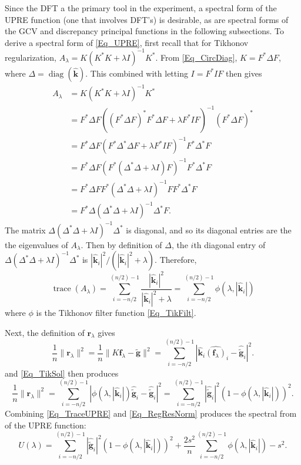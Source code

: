 \documentclass[12pt]{article}
\newcommand{\gnoise}{\widetilde{\mathbf{g}}}
\newcommand{\kdis}{\mathbf{k}}
\newcommand{\kmat}{K}	%
\newcommand{\fdis}{\mathbf{f}}
\newcommand{\ctrans}{*}	%
\newcommand{\trace}{\operatorname{trace}}	%
\newcommand{\diag}{\operatorname{diag}}
\newcommand{\regparam}{\lambda}
\newcommand{\freg}{\fdis_{\regparam}}	%
\newcommand{\filt}{\phi}
\newcommand{\SD}{s}	%
\newcommand{\regres}{\mathbf{r}_{\regparam}}	%
\newcommand{\A}{A_{\regparam}}	%
\newcommand{\U}{U}	%
\begin{document}
Since the DFT a the primary tool in the experiment, a spectral form of the UPRE function (one that involves DFT's) is desirable, as are spectral forms of the GCV and discrepancy principal functions in the following subsections. To derive a spectral form of \eqref{Eq_UPRE}, first recall that for Tikhonov regularization, $\A = \kmat(\kmat^\ctrans\kmat + \regparam{I})^{-1}\kmat^\ctrans$. From \eqref{Eq_CircDiag}, $\kmat = F^*\Delta{F}$, where $\Delta = \diag(\widehat{\kdis})$. This combined with letting $I = F^*IF$ then gives
\begin{align*}
\A &= \kmat(\kmat^\ctrans\kmat + \regparam{I})^{-1}\kmat^\ctrans \\
&= F^*\Delta{F}((F^*\Delta{F})^\ctrans F^*\Delta{F} + \regparam{F^*IF})^{-1}(F^*\Delta{F})^\ctrans \\
&= F^*\Delta{F}(F^*\Delta^\ctrans\Delta{F} + \regparam{F^*IF})^{-1}F^*\Delta^\ctrans{F} \\
&= F^*\Delta{F}(F^*(\Delta^\ctrans\Delta + \regparam{I})F)^{-1}F^*\Delta^\ctrans{F} \\
&= F^*\Delta{F}F^*(\Delta^\ctrans\Delta + \regparam{I})^{-1}FF^*\Delta^\ctrans{F} \\
&= F^*\Delta(\Delta^\ctrans\Delta + \regparam{I})^{-1}\Delta^\ctrans{F}.
\end{align*}
The matrix $\Delta(\Delta^\ctrans\Delta + \regparam{I})^{-1}\Delta^\ctrans$ is diagonal, and so its diagonal entries are the the eigenvalues of $\A$. Then by definition of $\Delta$, the $i$th diagonal entry of $\Delta(\Delta^\ctrans\Delta + \regparam{I})^{-1}\Delta^\ctrans$ is $|\widehat{\kdis}_i|^2/(|\widehat{\kdis}_i|^2 + \regparam)$. Therefore,
\begin{equation}
\trace(\A) = \sum_{i = -n/2}^{(n/2)-1} \frac{|\widehat{\kdis}_i|^2}{|\widehat{\kdis}_i|^2 + \regparam} = \sum_{i = -n/2}^{(n/2)-1} \filt(\regparam,|\widehat{\kdis}_i|)
\label{Eq_TraceUPRE}
\end{equation}
where $\filt$ is the Tikhonov filter function \eqref{Eq_TikFilt}. \par
Next, the definition of $\regres$ gives
\[\frac{1}{n}\|\regres\|^2 = \frac{1}{n}\|\kmat\freg - \gnoise\|^2 = \sum_{i = -n/2}^{(n/2)-1} |\widehat{\kdis}_i\widehat{(\freg)}_i - \widehat{\gnoise}_i|^2.\]
and \eqref{Eq_TikSol} then produces
\begin{equation}
\frac{1}{n}\|\regres\|^2 = \sum_{i = -n/2}^{(n/2)-1} |\filt(\regparam,|\widehat{\kdis}_i|)\widehat{\gnoise}_i - \widehat{\gnoise}_i|^2 = \sum_{i = -n/2}^{(n/2)-1} |\widehat{\gnoise}_i|^2(1 - \filt(\regparam,|\widehat{\kdis}_i|))^2.
\label{Eq_RegResNorm}
\end{equation}
Combining \eqref{Eq_TraceUPRE} and \eqref{Eq_RegResNorm} produces the spectral from of the UPRE function:
\begin{equation}
\U(\regparam) = \sum_{i = -n/2}^{(n/2)-1} |\widehat{\gnoise}_i|^2(1 - \filt(\regparam,|\widehat{\kdis}_i|))^2 + \frac{2\SD^2}{n}\sum_{i = -n/2}^{(n/2)-1} \filt(\regparam,|\widehat{\kdis}_i|) - \SD^2.
\label{Eq_SpectralUPRE}
\end{equation}
\end{document}
